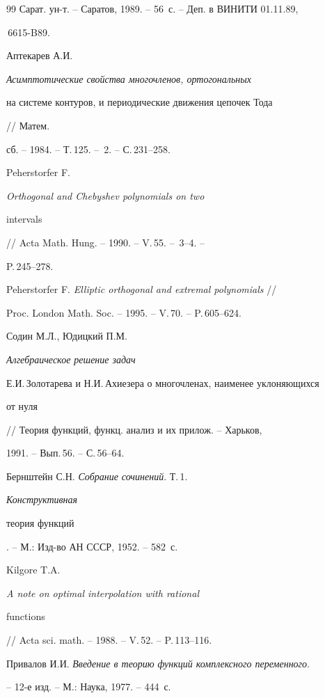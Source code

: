 \begin{thebibliography}{99}
Сарат. ун-т. -- Саратов, 1989. -- 56~с. -- Деп. в ВИНИТИ 01.11.89,


\No\,6615-B89.




Аптекарев А.И. {\em Асимптотические свойства многочленов, ортогональных


на системе контуров, и периодические движения цепочек Тода} // Матем.


сб. -- 1984. -- Т.\,125. -- \No\,2. -- С.\,231--258.




Peherstorfer F. {\em Orthogonal and Chebyshev polynomials on two


intervals} // Acta Math. Hung. -- 1990. -- V.\,55. -- \No\,3--4. --


P.\,245--278.




Peherstorfer F. {\em Elliptic orthogonal and extremal polynomials} //


Proc. London Math. Soc. -- 1995. -- V.\,70. -- P.\,605--624.




Содин М.Л., Юдицкий П.М. {\em Алгебраическое решение задач


Е.И.\,Золотарева и Н.И.\,Ахиезера о многочленах, наименее уклоняющихся


от нуля} // Теория функций, функц. анализ и их прилож. -- Харьков,


1991. -- Вып.\,56. -- С.\,56--64.




Бернштейн С.Н. {\em Собрание сочинений}. Т.\,1. {\em Конструктивная


теория функций}. -- М.: Изд-во АН СССР, 1952. -- 582~с.




Kilgore T.A. {\em A note on optimal interpolation with rational


functions} // Acta sci. math. -- 1988. -- V.\,52. -- P.\,113--116.




Привалов И.И. {\em Введение в теорию функций комплексного переменного}.


-- 12-е изд. -- М.: Наука, 1977. -- 444~с.








\end{thebibliography}





\vskip 0.5cm












\label{end}






